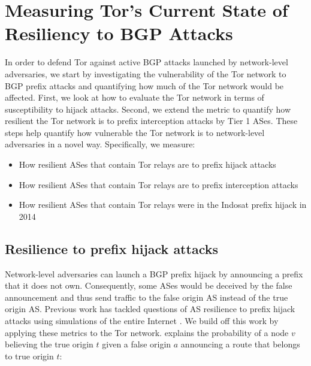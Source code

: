 \section{Measuring Tor's Current State of Resiliency to BGP Attacks}
\label{hijack_interception_measurement}

In order to defend Tor against active BGP attacks launched by network-level adversaries, we start by investigating the vulnerability of the Tor network to BGP prefix attacks and quantifying how much of the Tor network would be affected. First, we look at how to evaluate the Tor network in terms of susceptibility to hijack attacks. Second, we extend the metric to quantify how resilient the Tor network is to prefix interception attacks by Tier 1 ASes. These steps help quantify how vulnerable the Tor network is to network-level adversaries in a novel way.  Specifically, we measure:

\begin{itemize}
\item How resilient ASes that contain Tor relays are to prefix hijack attacks
\item How resilient ASes that contain Tor relays are to prefix interception attacks
\item How resilient ASes that contain Tor relays were in the Indosat prefix hijack in 2014
\end{itemize}

\subsection{Resilience to prefix hijack attacks}
\label{hijack_methodology}

Network-level adversaries can launch a BGP prefix hijack by announcing a prefix that it does not own. Consequently, some ASes would be deceived by the false announcement and thus send traffic to the false origin AS instead of the true origin AS. Previous work has tackled questions of AS resilience to prefix hijack attacks using simulations of the entire Internet \cite{lad2007understanding}.  We build off this work by applying these metrics to the Tor network. \cite{lad2007understanding} explains the probability of a node $v$ believing the true origin $t$ given a false origin $a$ announcing a route that belongs to true origin $t$:

